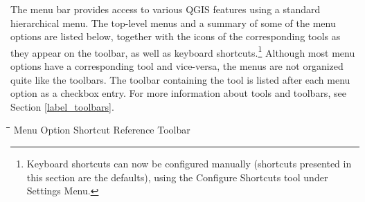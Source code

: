 The menu bar provides access to various QGIS features using a standard 
hierarchical menu. The top-level menus and a summary of some of the
menu options are listed below, together with the icons of the corresponding
tools as they appear on the toolbar, as well as keyboard
shortcuts.\footnote{Keyboard shortcuts can now be configured manually
(shortcuts presented in this section are the defaults), using the Configure 
Shortcuts tool under Settings Menu.}
Although most menu options have a corresponding tool and vice-versa,
the menus are not organized quite like the toolbars. 
The toolbar containing the tool is listed after each menu option as a checkbox
entry. For more information about tools and toolbars, see Section
\ref{label_toolbars}.

\begin{tabbing}
\hspace{5.5cm}\=\hspace{3cm}\=\hspace{3.5cm}\= \kill
\hspace{1cm} Menu Option \> Shortcut \> Reference \> Toolbar\\
\end{tabbing}

